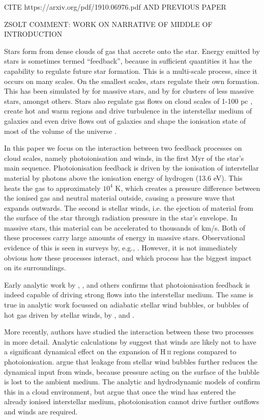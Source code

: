 \documentclass[a4paper,fleqn,usenatbib]{mnras}
\newcommand{\HII}{H$~$\textsc{ii}\xspace}
\begin{document}
CITE https://arxiv.org/pdf/1910.06976.pdf AND PREVIOUS PAPER

ZSOLT COMMENT: WORK ON NARRATIVE OF MIDDLE OF INTRODUCTION

Stars form from dense clouds of gas that accrete onto the star. Energy emitted by stars is sometimes termed ``feedback'', because in sufficient quantities it has the capability to regulate future star formation. This is a multi-scale process, since it occurs on many scales. On the smallest scales, stars regulate their own formation. This has been simulated by \cite{Kuiper2018} for massive stars, and by \cite{Bate2019} for clusters of less massive stars, amongst others. Stars also regulate gas flows on cloud scales of 1-100 pc \citep[see review by][]{Dale2015a}, create hot and warm regions and drive turbulence in the interstellar medium of galaxies \cite[e.g.][]{Gatto2017} and even drive flows out of galaxies \citep[see review on galactic winds by][]{Veilleux2005} and shape the ionisation state of most of the volume of the universe \citep[e.g.][]{Rosdahl2018}.

In this paper we focus on the interaction between two feedback processes on cloud scales, namely photoionisation and winds, in the first Myr of the star's main sequence. Photoionisation feedback is driven by the ionisation of interstellar material by photons above the ionisation energy of hydrogen (13.6 eV). This heats the gas to approximately $10^4$ K, which creates a pressure difference between the ionised gas and neutral material outside, causing a pressure wave that expands outwards. The second is stellar winds, i.e. the ejection of material from the surface of the star through radiation pressure in the star's envelope. In massive stars, this material can be accelerated to thousands of km/s. Both of these processes carry large amounts of energy in massive stars. Observational evidence of this is seen in surveys by, e.g., \cite{Doran2013}. However, it is not immediately obvious how these processes interact, and which process has the biggest impact on its surroundings.

Early analytic work by \cite{KahnF.D.1954}, \cite{SpitzerLyman1978}, \cite{Whitworth1979} and others confirms that photoionisation feedback is indeed capable of driving strong flows into the interstellar medium. The same is true in analytic work focussed on adiabatic stellar wind bubbles, or bubbles of hot gas driven by stellar winds, by \cite{Avedisova1972}, \cite{Castor1975} and \cite{Weaver1977}.

More recently, authors have studied the interaction between these two processes in more detail. Analytic calculations by \cite{Capriotti2001} suggest that winds are likely not to have a significant dynamical effect on the expansion of \HII regions compared to photoionisation. \cite{Krumholz2009} argue that leakage from stellar wind bubbles further reduces the dynamical input from winds, because pressure acting on the surface of the bubble is lost to the ambient medium. The analytic and hydrodynamic models of \cite{Haid2018} confirm this in a cloud environment, but argue that once the wind has entered the already ionised interstellar medium, photoionisation cannot drive further outflows and winds are required. 
\end{document}
